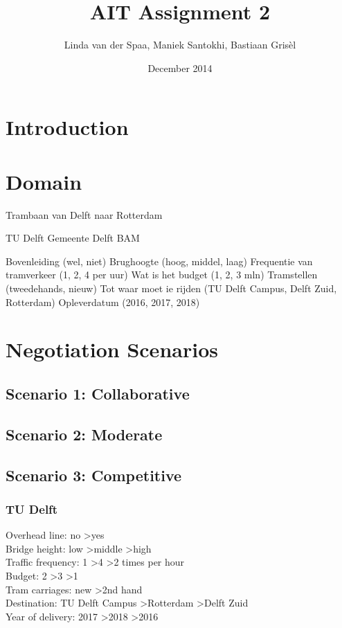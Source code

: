 \documentclass{article}
\title{AIT Assignment 2}
\author{Linda van der Spaa, Maniek Santokhi, Bastiaan Gris\`el}
\date{December 2014}
\begin{document}
\maketitle

\section{Introduction}

\section{Domain}
Trambaan van Delft naar Rotterdam

TU Delft
Gemeente Delft
BAM

Bovenleiding (wel, niet)
Brughoogte (hoog, middel, laag)
Frequentie van tramverkeer (1, 2, 4 per uur)
Wat is het budget (1, 2, 3 mln)
Tramstellen (tweedehands, nieuw)
Tot waar moet ie rijden (TU Delft Campus, Delft Zuid, Rotterdam)
Opleverdatum (2016, 2017, 2018)


\section{Negotiation Scenarios}

\subsection{Scenario 1: Collaborative}


\subsection{Scenario 2: Moderate}


\subsection{Scenario 3: Competitive}
\subsubsection{TU Delft}
Overhead line: no \textgreater yes \\
Bridge height: low \textgreater middle \textgreater high \\
Traffic frequency: 1 \textgreater 4 \textgreater 2 times per hour \\
Budget: 2 \textgreater 3 \textgreater 1 \\
Tram carriages: new \textgreater 2nd hand \\
Destination: TU Delft Campus \textgreater Rotterdam \textgreater Delft Zuid \\
Year of delivery: 2017 \textgreater 2018 \textgreater 2016 \\
\end{document}
